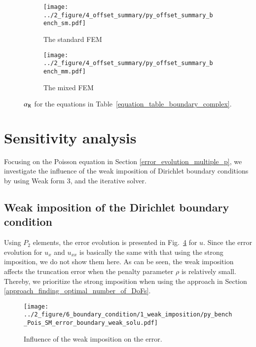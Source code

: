 \documentclass[review,3p]{elsarticle}
\begin{document}
\begin{figure}[!ht]
	\centering
    \begin{subfigure}{6.0cm}
        \texttt{[image: ../2\_figure/4\_offset\_summary/py\_offset\_summary\_bench\_sm.pdf]}
        \caption{The standard FEM}
        \label{py_offset_summary_bench_sm}
    \end{subfigure}
    \hspace{-0.2cm}
    \begin{subfigure}{6.0cm}
        \texttt{[image: ../2\_figure/4\_offset\_summary/py\_offset\_summary\_bench\_mm.pdf]}
        \caption{The mixed FEM}
        \label{py_offset_summary_bench_mm}
    \end{subfigure}
\caption{$\alpha_{\rm R}$ for the equations in Table~\ref{equation_table_boundary_complex}.}
\label{py_offset_summary_bench}
\end{figure}

\newpage
\section{Sensitivity analysis}       \label{section_sensitivity}

Focusing on the Poisson equation in Section \ref{error_evolution_multiple_p}, we investigate the influence of the weak imposition of Dirichlet boundary conditions by using Weak form 3, and the iterative solver.

\subsection{Weak imposition of the Dirichlet boundary condition}	\label{section_weak_imposition}

Using $P_2$ elements, the error evolution is presented in Fig.~\ref{sensitivity_weak_imposition} for $u$. Since the error evolution for $u_x$ and $u_{xx}$ is basically the same with that using the strong imposition, we do not show them here. As can be seen, the weak imposition affects the truncation error when the penalty parameter $\rho$ is relatively small. Thereby, we prioritize the strong imposition when using the approach in Section \ref{approach_finding_optimal_number_of_DoFs}.

\begin{figure}[!ht]
\centering
    \texttt{[image: ../2\_figure/6\_boundary\_condition/1\_weak\_imposition/py\_bench\_Pois\_SM\_error\_boundary\_weak\_solu.pdf]}
    \caption{Influence of the weak imposition on the error.}
    \label{sensitivity_weak_imposition}
\end{figure}
\end{document}
